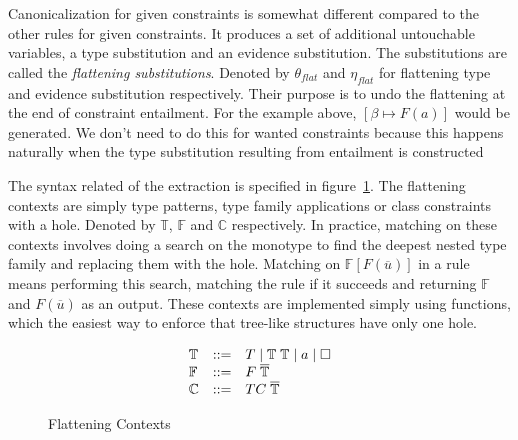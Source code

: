 Canonicalization for given constraints is somewhat different compared to the
other rules for given constraints. It produces a set of additional untouchable
variables, a type substitution and an evidence substitution. The substitutions
are called the \textit{flattening substitutions}. Denoted by $\theta_{flat}$ and
$\eta_{flat}$ for flattening type and evidence substitution respectively. Their
purpose is to undo the flattening at the end of constraint entailment. For the
example above, $[\beta \mapsto F(a)]$ would be generated. We don't need to do
this for wanted constraints because this happens naturally when the type
substitution resulting from entailment is constructed

The syntax related of the extraction is specified in
figure~\ref{fig:flattening-contexts}. The flattening contexts are simply type
patterns, type family applications or class constraints with a hole. Denoted by
$\mathbb{T}$, $\mathbb{F}$ and $\mathbb{C}$ respectively. In practice, matching
on these contexts involves doing a search on the monotype to find the deepest
nested type family and replacing them with the hole. Matching on
$\mathbb{F}[F(\overline{u})]$ in a rule means performing this search, matching
the rule if it succeeds and returning $\mathbb{F}$ and $F(\overline{u})$ as an
output. These contexts are implemented simply using functions, which the easiest
way to enforce that tree-like structures have only one hole.

\begin{figure}
\[
\begin{array}{l c l}
\mathbb{T} &::=& T \mid \mathbb{T} \; \mathbb{T} \mid a \mid \square\\
\mathbb{F} &::=& F \; \overline{\mathbb{T}}\\
\mathbb{C} &::=& TC \; \overline{\mathbb{T}}
\end{array}
\]
\caption{Flattening Contexts}
\label{fig:flattening-contexts}
\end{figure}


